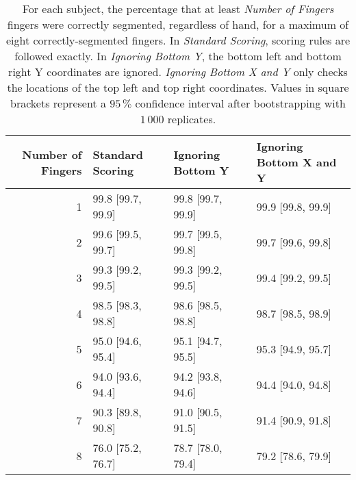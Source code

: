 \documentclass[]{article}
\begin{document}
\begin{table}[!h]

\caption{\label{tab:twoinch-per-subject-ci}For each subject, the percentage that at least \textit{Number of Fingers} fingers were correctly segmented, regardless of hand, for a maximum of eight correctly-segmented fingers. In \textit{Standard Scoring}, scoring rules are followed exactly. In \textit{Ignoring Bottom Y}, the bottom left and bottom right Y coordinates are ignored. \textit{Ignoring Bottom X and Y} only checks the locations of the top left and top right coordinates. Values in square brackets represent a \(95\,\%\) confidence interval after bootstrapping with \(1\,000\) replicates.}
\centering
\begin{tabular}{rlll}
\toprule
Number of Fingers & Standard Scoring & Ignoring Bottom Y & Ignoring Bottom X and Y\\
\midrule
\rowcolor{gray!6}  1 & 99.8 [99.7, 99.9] & 99.8 [99.7, 99.9] & 99.9 [99.8, 99.9]\\
2 & 99.6 [99.5, 99.7] & 99.7 [99.5, 99.8] & 99.7 [99.6, 99.8]\\
\rowcolor{gray!6}  3 & 99.3 [99.2, 99.5] & 99.3 [99.2, 99.5] & 99.4 [99.2, 99.5]\\
4 & 98.5 [98.3, 98.8] & 98.6 [98.5, 98.8] & 98.7 [98.5, 98.9]\\
\rowcolor{gray!6}  5 & 95.0 [94.6, 95.4] & 95.1 [94.7, 95.5] & 95.3 [94.9, 95.7]\\
6 & 94.0 [93.6, 94.4] & 94.2 [93.8, 94.6] & 94.4 [94.0, 94.8]\\
\rowcolor{gray!6}  7 & 90.3 [89.8, 90.8] & 91.0 [90.5, 91.5] & 91.4 [90.9, 91.8]\\
8 & 76.0 [75.2, 76.7] & 78.7 [78.0, 79.4] & 79.2 [78.6, 79.9]\\
\bottomrule
\end{tabular}
\end{table}
\end{document}

